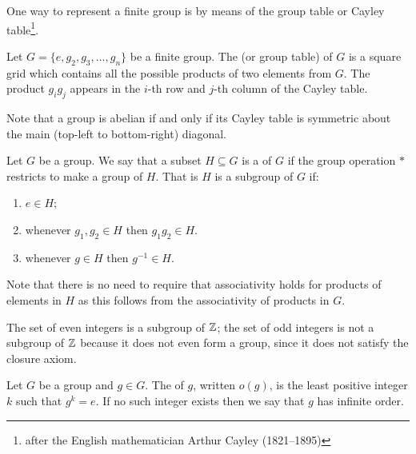 One way to represent a finite group is by means of the group table or Cayley table\footnote{after the English mathematician Arthur Cayley (1821--1895)}.

\begin{definition}
Let $G=\{e,g_2,g_3,\dots,g_n\}$ be a finite group. The  (or group table) of $G$ is a square grid which contains all the possible products of two elements from $G$. The product $g_ig_j$ appears in the $i$-th row and $j$-th column of the Cayley table.
\end{definition}

\begin{remark}
Note that a group is abelian if and only if its Cayley table is symmetric about the main (top-left to bottom-right) diagonal.
\end{remark}

\begin{definition}[Subgroup]
Let $G$ be a group. We say that a subset $H \subseteq G$ is a  of $G$ if the group operation $\ast$ restricts to make a group of $H$. That is $H$ is a subgroup of $G$ if:
\begin{enumerate}[label=(\roman*)]
\item $e \in H$;
\item whenever $g_1,g_2\in H$ then $g_1g_2 \in H$.
\item whenever $g \in H$ then $g^{-1} \in H$.
\end{enumerate}
\end{definition}

\begin{remark}
Note that there is no need to require that associativity holds for products of elements in $H$ as this follows from the associativity of products in $G$.
\end{remark}

\begin{example}
The set of even integers is a subgroup of $\mathbb Z$; the set of odd integers is not a subgroup of $\mathbb Z$ because it does not even form a group, since it does not satisfy the closure axiom.
\end{example}

\begin{definition}
Let $G$ be a group and $g \in G$. The  of $g$, written $o(g)$, is the least positive integer $k$ such that $g^k=e$. If no such integer exists then we say that $g$ has infinite order.
\end{definition}

